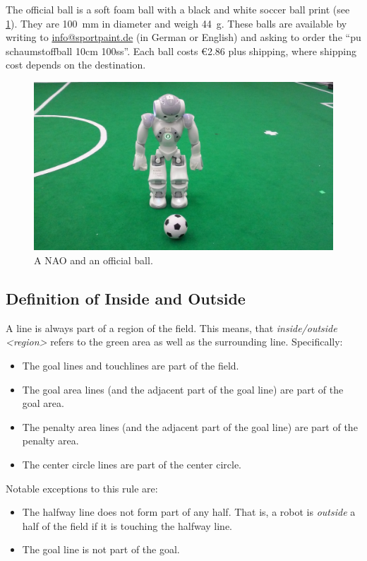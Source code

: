 The official ball is a soft foam ball with a black and white soccer ball print (see \cref{fig:ball}).
They are \qty{100}{\milli\metre} in diameter and weigh \qty{44}{\gram}.
These balls are available by writing to \url{info@sportpaint.de} (in German or English) and asking to order the ``pu schaumstoffball 10cm 100ss''.
Each ball costs \euro{2.86} plus shipping, where shipping cost depends on the destination.

\begin{figure}[t]
  \centerline{\includegraphics[height=0.28\columnwidth]{figs/robotWithBall2016.jpg}}
  \caption{A NAO and an official ball.}
  \label{fig:ball}
\end{figure}

\subsection{Definition of Inside and Outside}
\label{sec:inside_outside}

A line is always part of a region of the field.
This means, that \emph{inside/outside \textless region\textgreater} refers to the green area as well as the surrounding line.
Specifically:
\begin{itemize}
  \item The goal lines and touchlines are part of the field.
  \item The goal area lines (and the adjacent part of the goal line) are part of the goal area.
  \item The penalty area lines (and the adjacent part of the goal line) are part of the penalty area.
  \item The center circle lines are part of the center circle.
\end{itemize}

Notable exceptions to this rule are:
\begin{itemize}
  \item The halfway line does not form part of any half.
    That is, a robot is \textit{outside} a half of the field if it is touching the halfway line.
  \item The goal line is not part of the goal.
\end{itemize}

